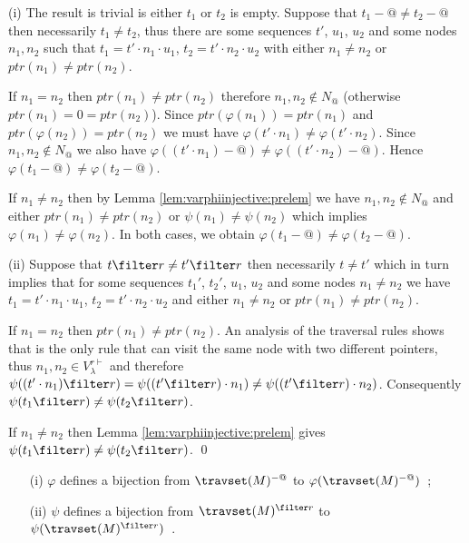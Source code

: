 
(i) The result is trivial is either $t_1$ or $t_2$ is empty.
Suppose that $t_1-@\neq t_2-@$ then necessarily $t_1 \neq t_2$, thus there are some sequences $t'$, $u_1$, $u_2$ and some nodes $n_1,n_2$ such that
 $t_1 = t' \cdot n_1 \cdot u_1$, $t_2 = t' \cdot n_2 \cdot u_2$ with either $n_1\neq n_2$ or $ptr(n_1) \neq ptr(n_2)$.

If $n_1 = n_2$ then $ptr(n_1) \neq ptr(n_2)$ therefore $n_1,n_2 \not\in N_@$ (otherwise $ptr(n_1) = 0 = ptr(n_2)$). Since $ptr(\varphi(n_1)) = ptr(n_1)$ and  $ptr(\varphi(n_2)) = ptr(n_2)$ we must have $\varphi(t' \cdot n_1) \neq \varphi(t' \cdot n_2)$. Since $n_1,n_2 \not\in N_@$ we also have $\varphi((t' \cdot n_1)-@) \neq \varphi((t' \cdot n_2)-@)$. Hence $\varphi(t_1-@) \neq \varphi(t_2-@)$.

If $n_1 \neq n_2$ then by Lemma \ref{lem:varphiinjective:prelem} we have $n_1,n_2 \not\in N_@$ and
either $ptr(n_1) \neq ptr(n_2)$ or $\psi(n_1) \neq \psi(n_2)$ which implies $\varphi(n_1) \neq \varphi(n_2)$.
In both cases, we obtain $\varphi(t_1-@) \neq \varphi(t_2-@)$.


(ii) Suppose that $t \filter r \neq t' \filter r$ then necessarily $t \neq t'$ which in turn implies that for some sequences $t_1'$, $t_2'$, $u_1$, $u_2$ and some nodes $n_1 \neq n_2$
we have $t_1 = t' \cdot n_1 \cdot u_1$, $t_2 = t' \cdot n_2 \cdot u_2$ and either $n_1\neq n_2$ or $ptr(n_1) \neq ptr(n_2)$.

If $n_1 = n_2$ then $ptr(n_1) \neq ptr(n_2)$. An analysis of the traversal rules shows that  is the only rule that can visit the same node with two different pointers, thus $n_1,n_2 \in V_\lambda^{r\vdash}$
and therefore $\psi( (t'\cdot n_1) \filter r ) = \psi( (t'\filter r) \cdot n_1 )  \neq \psi( (t'\filter r) \cdot n_2 )$. Consequently $\psi( t_1\filter r ) \neq \psi( t_2\filter r )$.

If $n_1 \neq n_2$ then Lemma \ref{lem:varphiinjective:prelem}
gives $\psi( t_1\filter r ) \neq \psi( t_2\filter r )$. \qed



\begin{corollary} \hfill
\label{cor:varphi_bij}
\begin{itemize}
\item[(i)] $\varphi$ defines a bijection from $\travset(M)^{-@}$
to $\varphi(\travset(M)^{-@})$\ ;
\item[(ii)] $\psi$ defines a bijection from $\travset(M)^{\filter r}$ to
$\psi(\travset(M)^{\filter r})$\ .
\end{itemize}
\end{corollary}

